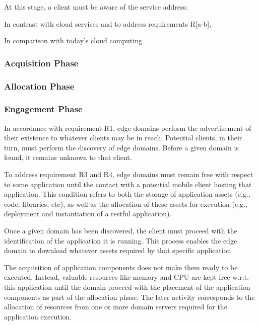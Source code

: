 At this stage, a client must be aware of the service address: 





In contrast with cloud services and to address requirements R[a-b],  

In comparison with today's cloud computing~\cite{}

\subsubsection{Acquisition Phase}\label{sec:a3-e-phases}

\subsubsection{Allocation Phase}\label{sec:a3-e-phases}

\subsubsection{Engagement Phase}\label{sec:a3-e-phases}

In accordance with requirement R1, edge domains perform the advertisement of their existence to whatever clients may be in reach. Potential clients, in their turn, must perform the discovery of edge domains. Before a given domain is found, it remains unknown to that client.

To address requirement R3 and R4, edge domains must remain free with respect to some application until the contact with a potential mobile client hosting that application. This condition refers to both the storage of application assets (e.g., code, libraries, etc), as well as the allocation of these assets for execution (e.g., deployment and instantiation of a restful application). 

Once a given domain has been discovered, the client must proceed with the identification of the application it is running. This process enables the edge domain to download whatever assets required by that specific application.  

The acquisition of application components does not make them ready to be executed. Instead, valuable resources like memory and CPU are kept free w.r.t. this application until the domain proceed with the placement of the application components as part of the allocation phase. The later activity corresponds to the allocation of resources from one or more domain servers required for the application execution. 	

